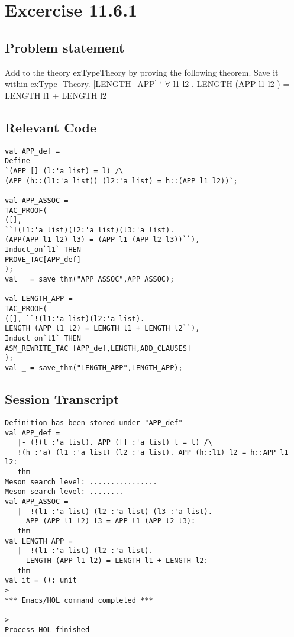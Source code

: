 \documentclass{report}
\begin{document}
\chapter{Excercise 11.6.1}
\label{cha:11.6.1}

\section{Problem statement}
\label{problem-statement-11-6-1}
Add to the theory exTypeTheory by proving the following theorem. Save it within exType-
Theory.
[LENGTH_APP]
` $\forall$ l1 l2 . LENGTH (APP l1 l2 ) = LENGTH l1 + LENGTH l2

\section{Relevant Code}
\label{rel-code-11-6-1}
\begin{lstlisting}[frame=TBlr]
val APP_def =
Define
`(APP [] (l:'a list) = l) /\
(APP (h::(l1:'a list)) (l2:'a list) = h::(APP l1 l2))`;

val APP_ASSOC =
TAC_PROOF(
([],
``!(l1:'a list)(l2:'a list)(l3:'a list).
(APP(APP l1 l2) l3) = (APP l1 (APP l2 l3))``),
Induct_on`l1` THEN
PROVE_TAC[APP_def]
);
val _ = save_thm("APP_ASSOC",APP_ASSOC);

val LENGTH_APP = 
TAC_PROOF(
([], ``!(l1:'a list)(l2:'a list).
LENGTH (APP l1 l2) = LENGTH l1 + LENGTH l2``),
Induct_on`l1` THEN
ASM_REWRITE_TAC	[APP_def,LENGTH,ADD_CLAUSES]
);
val _ = save_thm("LENGTH_APP",LENGTH_APP);
\end{lstlisting}

\section{Session Transcript}
\label{trans-11-6-1}

\begin{session}
  \begin{scriptsize}
\begin{verbatim}
Definition has been stored under "APP_def"
val APP_def =
   |- (!(l :'a list). APP ([] :'a list) l = l) /\
   !(h :'a) (l1 :'a list) (l2 :'a list). APP (h::l1) l2 = h::APP l1 l2:
   thm
Meson search level: ................
Meson search level: ........
val APP_ASSOC =
   |- !(l1 :'a list) (l2 :'a list) (l3 :'a list).
     APP (APP l1 l2) l3 = APP l1 (APP l2 l3):
   thm
val LENGTH_APP =
   |- !(l1 :'a list) (l2 :'a list).
     LENGTH (APP l1 l2) = LENGTH l1 + LENGTH l2:
   thm
val it = (): unit
> 
*** Emacs/HOL command completed ***

> 
Process HOL finished
\end{verbatim}
  \end{scriptsize}
\end{session}
\end{document}

